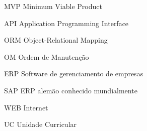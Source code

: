 \documentclass[
	12pt,				%
	openright,			%
	oneside,			%
	a4paper,			%
	chapter=TITLE,		%
	english,			%
	brazil,				%
	]{./Data/udesc}
\begin{document}


\begin{siglas}
  \item[MVP]      Minimum Viable Product
  \item[API]      Application Programming Interface
  \item[ORM]      Object-Relational Mapping
  \item[OM]		  Ordem de Manutenção
  \item[ERP]      Software de gerenciamento de empresas
  \item[SAP]	  ERP alemão conhecido mundialmente
  \item[WEB]	  Internet
  \item[UC]		  Unidade Curricular
\end{siglas}


\tableofcontents*
\cleardoublepage

\textual












% 

\postextual




%
%

\end{document}
